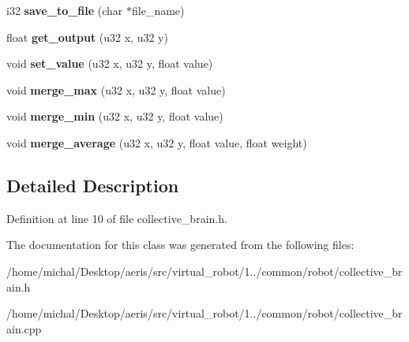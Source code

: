 \begin{DoxyCompactItemize}
\item 
\hypertarget{classCCollectiveBrain_ad73e195c1ae9a7e4a27da1809d8bd976}{i32 {\bfseries save\-\_\-to\-\_\-file} (char $\ast$file\-\_\-name)}\label{classCCollectiveBrain_ad73e195c1ae9a7e4a27da1809d8bd976}

\item 
\hypertarget{classCCollectiveBrain_aa4ac7fb568f2b32d3447de85ed4e3ffc}{float {\bfseries get\-\_\-output} (u32 x, u32 y)}\label{classCCollectiveBrain_aa4ac7fb568f2b32d3447de85ed4e3ffc}

\item 
\hypertarget{classCCollectiveBrain_a5336b7b533338ae3cb26a8acea9745b4}{void {\bfseries set\-\_\-value} (u32 x, u32 y, float value)}\label{classCCollectiveBrain_a5336b7b533338ae3cb26a8acea9745b4}

\item 
\hypertarget{classCCollectiveBrain_a8d9856fb8e5e2dc8eaf0e9a069566524}{void {\bfseries merge\-\_\-max} (u32 x, u32 y, float value)}\label{classCCollectiveBrain_a8d9856fb8e5e2dc8eaf0e9a069566524}

\item 
\hypertarget{classCCollectiveBrain_a7e7f9bd67383dd58a62493f8ccc48077}{void {\bfseries merge\-\_\-min} (u32 x, u32 y, float value)}\label{classCCollectiveBrain_a7e7f9bd67383dd58a62493f8ccc48077}

\item 
\hypertarget{classCCollectiveBrain_aa7f35d24b962fd0c400a90bc864328e2}{void {\bfseries merge\-\_\-average} (u32 x, u32 y, float value, float weight)}\label{classCCollectiveBrain_aa7f35d24b962fd0c400a90bc864328e2}

\end{DoxyCompactItemize}


\subsection{Detailed Description}


Definition at line 10 of file collective\-\_\-brain.\-h.



The documentation for this class was generated from the following files\-:\begin{DoxyCompactItemize}
\item 
/home/michal/\-Desktop/aeris/src/virtual\-\_\-robot/1../common/robot/collective\-\_\-brain.\-h\item 
/home/michal/\-Desktop/aeris/src/virtual\-\_\-robot/1../common/robot/collective\-\_\-brain.\-cpp\end{DoxyCompactItemize}
